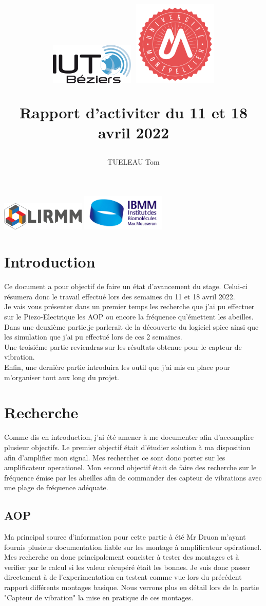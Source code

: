 \documentclass[11pt,french,a4paper]{article}
\title{
 \centering
         \includegraphics[width=4cm]{../../../logo/IUTlogo.png}  \hspace{7cm}
         \includegraphics[width=4cm]{../../../logo/UMlogo.png}  \hspace{7cm}
    
	\LARGE{Rapport d'activiter du 11 et 18 avril 2022}
	\author{TUELEAU Tom}
}
\author{
	\date{}
}
\begin{document}
\maketitle
	 \includegraphics[width=4cm]{../../../logo/LIRMMlogo.png}  \hspace{7cm}
         \includegraphics[width=4cm]{../../../logo/IBMMlogo.jpg}  \hspace{7cm}
\newpage
\tableofcontents
\newpage
\section{Introduction}
Ce document a pour objectif de faire un état d'avancement du stage. Celui-ci résumera donc le travail effectué lors des semaines du 11 et 18 avril 2022.
\\Je vais vous présenter dans un premier temps les recherche que j'ai pu effectuer sur le Piezo-Electrique les AOP ou encore la fréquence qu'émettent les abeilles. 
\\Dans une deuxième partie,je parlerait de la découverte du logiciel spice ainsi que les simulation que j'ai pu effectué lors de ces 2 semaines.
\\Une troisiéme partie reviendras sur les résultats obtenue pour le capteur de vibration. 
\\Enfin, une dernière partie introduira les outil que j'ai mis en place pour m'organiser tout aux long du projet. 

\newpage
\section{Recherche}
Comme dis en introduction, j'ai été amener à me documenter afin d'accomplire plusieur objectifs. Le premier objectif était d'étudier solution à ma disposition afin d'amplifier mon signal. Mes rechercher ce sont donc porter sur les amplificateur operationel. Mon second objectif était de faire des recherche sur le fréquence émise par les abeilles afin de commander des capteur de vibrations avec une plage de fréquence adéquate. 
\subsection{AOP}
Ma principal source d'information pour cette partie à été Mr Druon m'ayant fournis plusieur documentation fiable sur les montage à amplificateur opérationel. 
Mes recherche on donc principalement concister à tester des montages et à verifier par le calcul si les valeur récupéré était les bonnes.
Je suis donc passer directement à de l'experimentation en testent comme vue lors du précédent rapport différents montages basique.
Nous verrons plus en détail lors de la partie "Capteur de vibration" la mise en pratique de ces montages.
\end{document}
